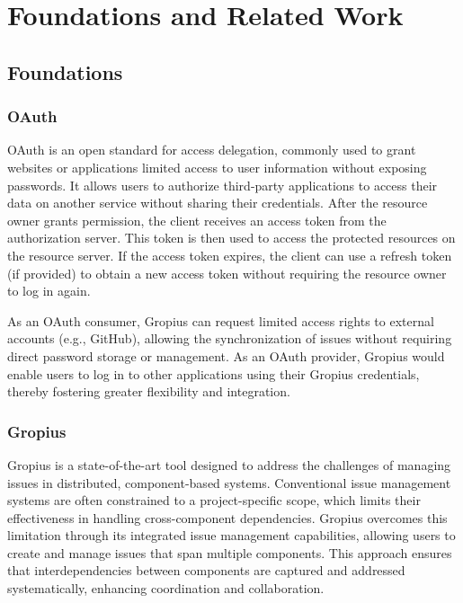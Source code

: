 
\chapter{Foundations and Related Work}
\label{chap:foundation}




\section{Foundations}
\subsection*{OAuth}
OAuth \cite{jones2012oauth} is an open standard for access delegation, commonly used to grant websites or applications limited access to user information without exposing passwords. It allows users to authorize third-party applications to access their data on another service without sharing their credentials. After the resource owner grants permission, the client receives an access token from the authorization server. This token is then used to access the protected resources on the resource server. If the access token expires, the client can use a refresh token (if provided) to obtain a new access token without requiring the resource owner to log in again.

As an OAuth consumer, Gropius can request limited access rights to external accounts (e.g., GitHub),
allowing the synchronization of issues without requiring direct password storage or management.
As an OAuth provider, Gropius would enable users to log in to other applications using their Gropius credentials,
thereby fostering greater flexibility and integration. \\

\subsection*{Gropius}
Gropius is a state-of-the-art tool designed to address the challenges of managing issues in distributed, component-based systems. Conventional issue management systems are often constrained to a project-specific scope, which limits their effectiveness in handling cross-component dependencies. Gropius overcomes this limitation through its integrated issue management capabilities, allowing users to create and manage issues that span multiple components. This approach ensures that interdependencies between components are captured and addressed systematically, enhancing coordination and collaboration.

